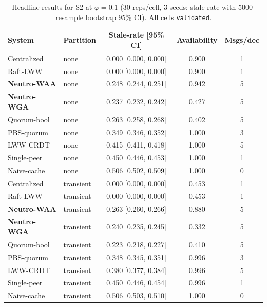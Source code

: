 \begin{table}[t]
\centering
\small
\caption{Headline results for S2 at $\varphi=0.1$ (30 reps/cell, 3 seeds; stale-rate with 5000-resample bootstrap 95\% CI). All cells \texttt{validated}.}
\label{tab:headline-s2}
\begin{tabular}{llccc}
\toprule
System & Partition & Stale-rate [95\% CI] & Availability & Msgs/dec \\
\midrule
Centralized & none & 0.000 [0.000, 0.000] & 0.900 & 1 \\
Raft-LWW & none & 0.000 [0.000, 0.000] & 0.900 & 1 \\
\textbf{Neutro-WAA} & none & 0.248 [0.244, 0.251] & 0.942 & 5 \\
\textbf{Neutro-WGA} & none & 0.237 [0.232, 0.242] & 0.427 & 5 \\
Quorum-bool & none & 0.263 [0.258, 0.268] & 0.402 & 5 \\
PBS-quorum & none & 0.349 [0.346, 0.352] & 1.000 & 3 \\
LWW-CRDT & none & 0.415 [0.411, 0.418] & 1.000 & 5 \\
Single-peer & none & 0.450 [0.446, 0.453] & 1.000 & 1 \\
Naive-cache & none & 0.506 [0.502, 0.509] & 1.000 & 0 \\
Centralized & transient & 0.000 [0.000, 0.000] & 0.453 & 1 \\
Raft-LWW & transient & 0.000 [0.000, 0.000] & 0.453 & 1 \\
\textbf{Neutro-WAA} & transient & 0.263 [0.260, 0.266] & 0.880 & 5 \\
\textbf{Neutro-WGA} & transient & 0.240 [0.235, 0.245] & 0.332 & 5 \\
Quorum-bool & transient & 0.223 [0.218, 0.227] & 0.410 & 5 \\
PBS-quorum & transient & 0.348 [0.345, 0.351] & 0.996 & 3 \\
LWW-CRDT & transient & 0.380 [0.377, 0.384] & 0.996 & 5 \\
Single-peer & transient & 0.450 [0.446, 0.454] & 0.996 & 1 \\
Naive-cache & transient & 0.506 [0.503, 0.510] & 1.000 & 0 \\
\bottomrule
\end{tabular}
\end{table}
